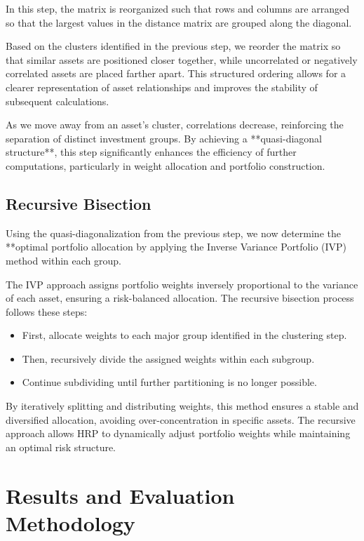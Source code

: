 \documentclass[english]{maciarticle}
\begin{document}
In this step, the matrix is reorganized such that rows and columns are arranged so that the largest values in the distance matrix are grouped along the diagonal.

Based on the clusters identified in the previous step, we reorder the matrix so that similar assets are positioned closer together, while uncorrelated or negatively correlated assets are placed farther apart. This structured ordering allows for a clearer representation of asset relationships and improves the stability of subsequent calculations.

As we move away from an asset’s cluster, correlations decrease, reinforcing the separation of distinct investment groups. By achieving a **quasi-diagonal structure**, this step significantly enhances the efficiency of further computations, particularly in weight allocation and portfolio construction.

\subsection{Recursive Bisection}

Using the quasi-diagonalization from the previous step, we now determine the **optimal portfolio allocation by applying the Inverse Variance Portfolio (IVP) method within each group. 

The IVP approach assigns portfolio weights inversely proportional to the variance of each asset, ensuring a risk-balanced allocation. The recursive bisection process follows these steps:

\begin{itemize}
    \item First, allocate weights to each major group identified in the clustering step.
    \item Then, recursively divide the assigned weights within each subgroup.
    \item Continue subdividing until further partitioning is no longer possible.
\end{itemize}

By iteratively splitting and distributing weights, this method ensures a stable and diversified allocation, avoiding over-concentration in specific assets. The recursive approach allows HRP to dynamically adjust portfolio weights while maintaining an optimal risk structure.


\section{Results and Evaluation Methodology}
\end{document}
